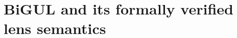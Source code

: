\documentclass{sigplanconf}
\newtheorem*{theorem}{Theorem}
\renewcommand{\emph}{\textsl}
\begin{document}
\section{BiGUL and its formally verified lens semantics}
\label{sec:BiGUL}

\end{document}
